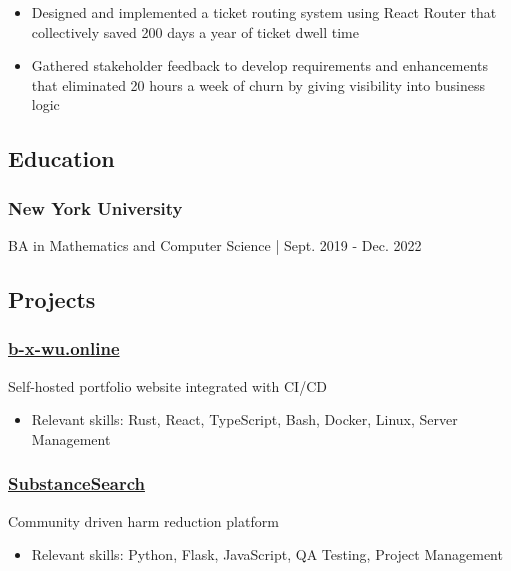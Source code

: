 \documentclass[11pt, oneside]{article}
\begin{document}
\begin{itemize}
\item Designed and implemented a ticket routing system using React Router that collectively saved 200 days a year of ticket dwell time

\item Gathered stakeholder feedback to develop requirements and enhancements that eliminated 20 hours a week of churn by giving visibility into business logic
\end{itemize}

\subsection{Education}

\subsubsection{New York University}
BA in Mathematics and Computer Science | Sept. 2019 - Dec. 2022

\subsection{Projects}

\subsubsection{\href{https://b-x-wu.online/}{b-x-wu.online}}
Self-hosted portfolio website integrated with CI/CD

\begin{itemize}
\item Relevant skills: Rust, React, TypeScript, Bash, Docker, Linux, Server Management
\end{itemize}

\subsubsection{\href{https://github.com/SubstanceSearch/SubstanceSearch}{SubstanceSearch}}
Community driven harm reduction platform

\begin{itemize}
\item Relevant skills: Python, Flask, JavaScript, QA Testing, Project Management
\end{itemize}
\end{document}
